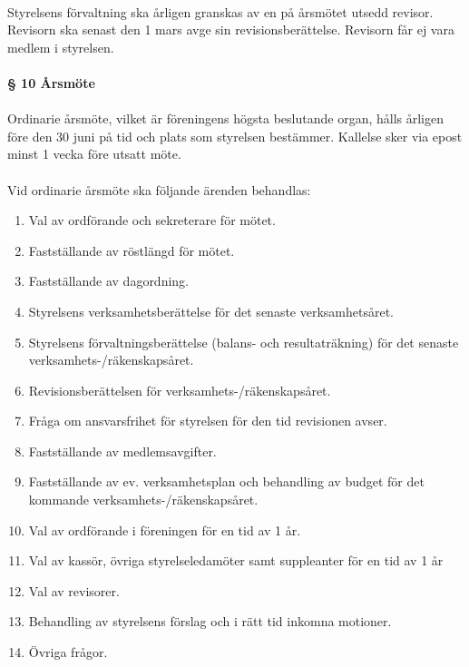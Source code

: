 \documentclass[12pt, a4paper]{article}
\begin{document}
\paragraph{}
Styrelsens förvaltning ska årligen granskas av en på årsmötet utsedd revisor. Revisorn ska senast den 1 mars avge sin revisionsberättelse. Revisorn får ej vara medlem i styrelsen.

\paragraph{§ 10 Årsmöte}
\paragraph{}
Ordinarie årsmöte, vilket är föreningens högsta beslutande organ, hålls årligen före den 30 juni på tid och plats som styrelsen bestämmer. Kallelse sker via epost minst 1 vecka före utsatt möte.

\paragraph{}
Vid ordinarie årsmöte ska följande ärenden behandlas:
\begin{enumerate}
\item Val av ordförande och sekreterare för mötet.
\item Fastställande av röstlängd för mötet.
\item Fastställande av dagordning.
\item Styrelsens verksamhetsberättelse för det senaste verksamhetsåret.
\item Styrelsens förvaltningsberättelse (balans- och resultaträkning) för det senaste verksamhets-/räkenskapsåret.
\item Revisionsberättelsen för verksamhets-/räkenskapsåret.
\item Fråga om ansvarsfrihet för styrelsen för den tid revisionen avser.
\item Fastställande av medlemsavgifter.
\item Fastställande av ev. verksamhetsplan och behandling av budget för det kommande verksamhets-/räkenskapsåret.
\item Val av ordförande i föreningen för en tid av 1 år.
\item Val av kassör, övriga styrelseledamöter samt suppleanter för en tid av 1 år
\item Val av revisorer.
\item Behandling av styrelsens förslag och i rätt tid inkomna motioner.
\item Övriga frågor. 
\end{enumerate}
\end{document}
